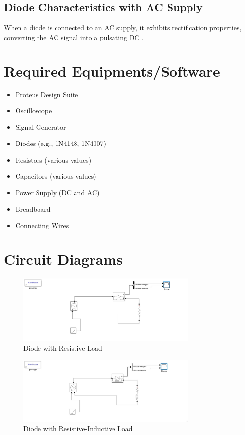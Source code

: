 \documentclass[12pt]{article}
\begin{document}
\subsection*{Diode Characteristics with AC Supply}
When a diode is connected to an AC supply, it exhibits rectification properties, converting the AC signal into a pulsating DC \cite{ac_supply}.

\section*{Required Equipments/Software}
\begin{itemize}
    \item Proteus Design Suite
    \item Oscilloscope
    \item Signal Generator
    \item Diodes (e.g., 1N4148, 1N4007)
    \item Resistors (various values)
    \item Capacitors (various values)
    \item Power Supply (DC and AC)
    \item Breadboard
    \item Connecting Wires
\end{itemize}

\section*{Circuit Diagrams}
\begin{figure}[H]
    \centering
    \includegraphics[width=0.8\textwidth]{Rdiag.jpg}
    \caption{Diode with Resistive Load}
    \label{fig:dc_r_load}
\end{figure}

\begin{figure}[H]
    \centering
    \includegraphics[width=0.8\textwidth]{RLdiag.jpg}
    \caption{Diode with Resistive-Inductive Load}
    \label{fig:dc_rl_load}
\end{figure}
\end{document}
